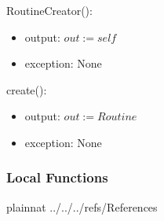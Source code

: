 \documentclass[12pt, titlepage]{article}
\begin{document}
\noindent RoutineCreator():
\begin{itemize}
	\item output: $out := self$
	\item exception: None
\end{itemize}

\noindent create():
\begin{itemize}
	\item output: $out := Routine$
	\item exception: None
\end{itemize}

\subsubsection{Local Functions}

\newpage

 {plainnat}
 {../../../refs/References}
\end{document}
